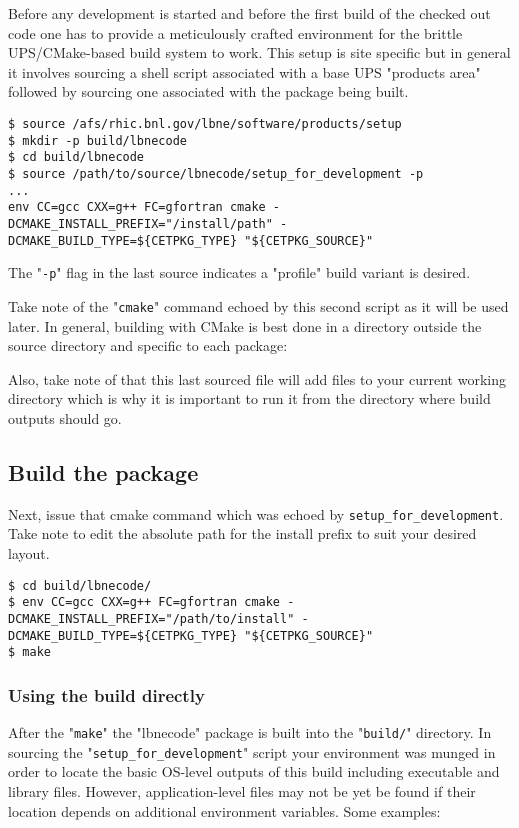 \documentclass[11pt]{article}
\begin{document}
Before any development is started and before the first build of the checked out code one has to provide a meticulously crafted environment for the brittle UPS/CMake-based build system to work.  This setup is site specific but in general it involves sourcing a shell script associated with a base UPS "products area" followed by sourcing one associated with the package being built.

\begin{verbatim}
$ source /afs/rhic.bnl.gov/lbne/software/products/setup
$ mkdir -p build/lbnecode
$ cd build/lbnecode
$ source /path/to/source/lbnecode/setup_for_development -p
...
env CC=gcc CXX=g++ FC=gfortran cmake -DCMAKE_INSTALL_PREFIX="/install/path" -DCMAKE_BUILD_TYPE=${CETPKG_TYPE} "${CETPKG_SOURCE}"
\end{verbatim}

The "\texttt{-p}" flag in the last source indicates a "profile" build variant is desired.  

Take note of the "\texttt{cmake}" command echoed by this second script as it will be used later.
In general, building with CMake is best done in a directory outside the source directory and specific to each package:

Also, take note of that this last sourced file will add files to your current working directory which is why it is important to run it from the directory where build outputs should go.
\subsection{Build the package}
\label{sec-1-5}

Next, issue that cmake command which was echoed by \texttt{setup\_for\_development}.  Take note to edit the absolute path for the install prefix to suit your desired layout.

\begin{verbatim}
$ cd build/lbnecode/
$ env CC=gcc CXX=g++ FC=gfortran cmake -DCMAKE_INSTALL_PREFIX="/path/to/install" -DCMAKE_BUILD_TYPE=${CETPKG_TYPE} "${CETPKG_SOURCE}"
$ make
\end{verbatim}

\subsubsection{Using the build directly}
\label{sec-1-5-1}

After the "\texttt{make}" the "lbnecode" package is built into the "\texttt{build/}" directory.  In sourcing the "\texttt{setup\_for\_development}" script your environment was munged in order to locate the basic OS-level outputs of this build including executable and library files.  However, application-level files may not be yet be found if their location depends on additional environment variables.  Some examples:
\end{document}
